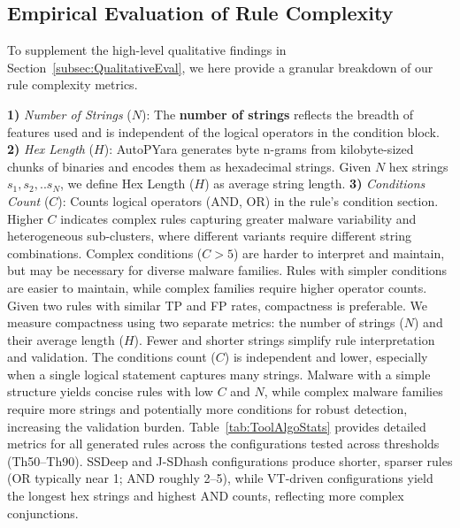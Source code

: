 \subsection{Empirical Evaluation of Rule Complexity}
\label{app:rme}

 \noindent To supplement the high-level qualitative findings in Section~\ref{subsec:QualitativeEval}, we here provide a granular breakdown of our rule complexity metrics.

\noindent \textbf{1)} \textit{Number of Strings} ($N$): The \textbf{number of strings} reflects the breadth of features used and is independent of the logical operators in the condition block.\newline
\noindent \textbf{2)} \textit{Hex Length} ($H$):  
AutoPYara generates byte n-grams from kilobyte-sized chunks of binaries and encodes them as hexadecimal strings. Given $N$ hex strings $s_1, s_2,..s_N$, we define Hex Length ($H$) as average string length.\newline
\noindent \textbf{3)} \textit{Conditions Count} ($C$): Counts logical operators (AND, OR) in the rule's condition section. Higher $C$ indicates complex rules capturing greater malware variability and heterogeneous sub-clusters, where different variants require different string combinations. Complex conditions ($C > 5$) are harder to interpret and maintain, but may be necessary for diverse malware families. Rules with simpler conditions are easier to maintain, while complex families require higher operator counts.
Given two rules with similar TP and FP rates, compactness is preferable. We measure compactness using two separate metrics: the number of strings ($N$) and their average length ($H$). Fewer and shorter strings simplify rule interpretation and validation. The conditions count ($C$) is independent and lower, especially when a single logical statement captures many strings. Malware with a simple structure yields concise rules with low $C$ and $N$, while complex malware families require more strings and potentially more conditions for robust detection, increasing the validation burden.  Table~\ref{tab:ToolAlgoStats} provides detailed metrics for all generated rules across the configurations tested across thresholds (Th50–Th90). SSDeep and J-SDhash configurations produce shorter, sparser rules (OR typically near 1; AND roughly 2–5), while VT-driven configurations yield the longest hex strings and highest AND counts, reflecting more complex conjunctions. 











